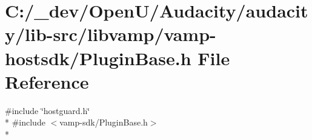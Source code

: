 \hypertarget{vamp-hostsdk_2_plugin_base_8h}{}\section{C\+:/\+\_\+dev/\+Open\+U/\+Audacity/audacity/lib-\/src/libvamp/vamp-\/hostsdk/\+Plugin\+Base.h File Reference}
\label{vamp-hostsdk_2_plugin_base_8h}
{\ttfamily \#include \char`\"{}hostguard.\+h\char`\"{}}\\*
{\ttfamily \#include $<$vamp-\/sdk/\+Plugin\+Base.\+h$>$}\\*

